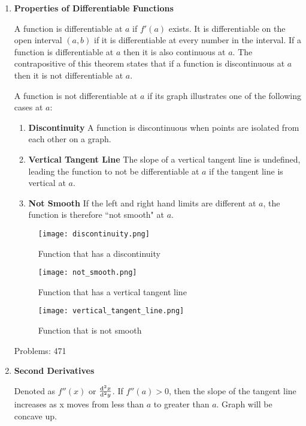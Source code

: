 \documentclass{article}
\begin{document}
\begin{enumerate}

\item \textbf{Properties of Differentiable Functions}

A function is differentiable at $a$ if $f'(a)$ exists. It is differentiable on the open interval $(a, b)$ if it is differentiable at every number in the interval. If a function is differentiable at $a$ then it is also continuous at $a$. The contrapositive of this theorem states that if a function is discontinuous at $a$ then it is not differentiable at $a$.

A function is not differentiable at $a$ if its graph illustrates one of the following cases at $a$:

\begin{enumerate}
    \item \textbf{Discontinuity}
    A function is discontinuous when points are isolated from each other on a graph.
    
    \item \textbf{Vertical Tangent Line}
    The slope of a vertical tangent line is undefined, leading the function to not be differentiable at $a$ if the tangent line is vertical at $a$. 
    
    \item \textbf{Not Smooth}
    If the left and right hand limits are different at $a$, the function is therefore ``not smooth" at $a$. 
\end{enumerate}

\begin{figure}[H]
  \texttt{[image: discontinuity.png]}
  \caption{Function that has a discontinuity}\label{fig:awesome_image1}
\endminipage\hfill
{}
  \texttt{[image: not\_smooth.png]}
  \caption{Function that has a vertical tangent line}\label{fig:awesome_image2}
\endminipage\hfill
{}%
  \texttt{[image: vertical\_tangent\_line.png]}
  \caption{Function that is not smooth}\label{fig:awesome_image3}
\endminipage
\end{figure}

Problems: 471

\item \textbf{Second Derivatives}

Denoted as $f''(x)$ or $\frac{\odif[order={2}]{x}}{\odif[order={2}]{y}}$. 
If $f''(a) > 0$, then the slope of the tangent line increases as x moves from less than $a$ to greater than $a$. Graph will be concave up.


\end{enumerate}
\end{document}
